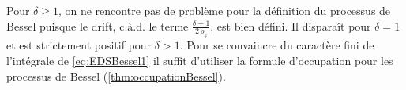 \documentclass[openany]{book}
\newcommand{\1}{\mathbbm{1}}
\renewcommand{\d}{\mathrm{d}}
\theoremstyle{thmfont}
\theoremstyle{deffont}
\theoremstyle{thmfont}
\theoremstyle{deffont}
\begin{document}
Pour $\delta \ge 1$, on ne rencontre pas de problème pour la définition du processus de Bessel puisque le drift, c.à.d. le terme $\frac{\delta-1}{2\,\rho_s}$, est bien défini. Il disparaît pour $\delta = 1$ et est strictement positif pour $\delta > 1$. Pour se convaincre du caractère fini de l'intégrale de \eqref{eq:EDSBessel1} il suffit d'utiliser la formule d'occupation pour les processus de Bessel (\autoref{thm:occupationBessel}).

%
\end{document}

